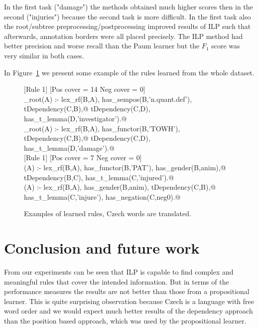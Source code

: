 \documentclass[runningheads,a4paper]{llncs}
\begin{document}
In the first task ("damage") the methods obtained much higher scores then in the second ("injuries") because the second task is more difficult. In the first task also the root/subtree preprocessing/postprocessing improved results of ILP such that afterwards, annotation borders were all placed precisely. The ILP method had better precision and worse recall than the Paum learner but the $F_1$ score was very similar in both cases.


In Figure~\ref{fig:rules} we present some example of the rules learned from the whole dataset.

\begin{figure}
	\scriptsize
[Rule 1] [Pos cover = 14 Neg cover = 0]\\
\verb@damage_root(A) :- lex_rf(B,A), has_sempos(B,'n.quant.def'), tDependency(C,B),@
\verb@   tDependency(C,D), has_t_lemma(D,'investigator').@ %
\smallskip\newline
[Rule 2] [Pos cover = 13 Neg cover = 0]\\
\verb@damage_root(A) :- lex_rf(B,A), has_functor(B,'TOWH'), tDependency(C,B),@
\verb@   tDependency(C,D), has_t_lemma(D,'damage').@\\


[Rule 1] [Pos cover = 7 Neg cover = 0]\\
\verb@injuries(A) :- lex_rf(B,A), has_functor(B,'PAT'), has_gender(B,anim),@
\verb@   tDependency(B,C), has_t_lemma(C,'injured').@
\smallskip\newline
[Rule 8] [Pos cover = 6 Neg cover = 0]\\
\verb@injuries(A) :- lex_rf(B,A), has_gender(B,anim), tDependency(C,B),@
\verb@   has_t_lemma(C,'injure'), has_negation(C,neg0).@
	\caption{Examples of learned rules, Czech words are translated.}
	\label{fig:rules}
\end{figure}















\section{Conclusion and future work}
From our experiments can be seen that ILP is capable to find complex and meaningful rules that cover the intended information. But in terms of the performance measures the results are not better than those from a propositional learner. This is quite surprising observation because Czech is a language with free word order and we would expect much better results of the dependency approach than the position based approach, which was used by the propositional learner.
\end{document}
